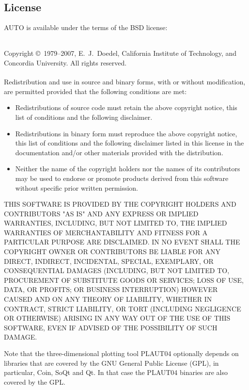 \documentclass[12pt]{report}
\begin{document}
\subsection*{License}
{\cal AUTO} is available under the terms of the BSD license:\\
\begin{footnotesize}
~\\
Copyright \copyright~1979--2007, E.~J.~Doedel, California Institute of
Technology, and Concordia University.  All rights reserved.\\
~\\
Redistribution and use in source and binary forms, with or without
modification, are permitted provided that the following conditions are
met:
\begin{itemize}
\item Redistributions of source code must retain the above copyright
  notice, this list of conditions and the following disclaimer. 
  
\item Redistributions in binary form must reproduce the above copyright
  notice, this list of conditions and the following disclaimer listed
  in this license in the documentation and/or other materials
  provided with the distribution.
  
\item Neither the name of the copyright holders nor the names of its
  contributors may be used to endorse or promote products derived from
  this software without specific prior written permission.
\end{itemize}
THIS SOFTWARE IS PROVIDED BY THE COPYRIGHT HOLDERS AND CONTRIBUTORS
"AS IS" AND ANY EXPRESS OR IMPLIED WARRANTIES, INCLUDING, BUT NOT  
LIMITED TO, THE IMPLIED WARRANTIES OF MERCHANTABILITY AND FITNESS FOR
A PARTICULAR PURPOSE ARE DISCLAIMED. IN NO EVENT SHALL THE COPYRIGHT 
OWNER OR CONTRIBUTORS BE LIABLE FOR ANY DIRECT, INDIRECT, INCIDENTAL,
SPECIAL, EXEMPLARY, OR CONSEQUENTIAL DAMAGES (INCLUDING, BUT NOT
LIMITED TO, PROCUREMENT OF SUBSTITUTE GOODS OR SERVICES; LOSS OF USE,
DATA, OR PROFITS; OR BUSINESS INTERRUPTION) HOWEVER CAUSED AND ON ANY
THEORY OF LIABILITY, WHETHER IN CONTRACT, STRICT LIABILITY, OR TORT  
(INCLUDING NEGLIGENCE OR OTHERWISE) ARISING IN ANY WAY OUT OF THE USE
OF THIS SOFTWARE, EVEN IF ADVISED OF THE POSSIBILITY OF SUCH DAMAGE. 
\end{footnotesize}

Note that the three-dimensional plotting tool PLAUT04 optionally
depends on libraries that are covered by the GNU General Public
License (GPL), in particular, Coin, SoQt and Qt. In that case the
PLAUT04 binaries are also covered by the GPL.
\end{document}
